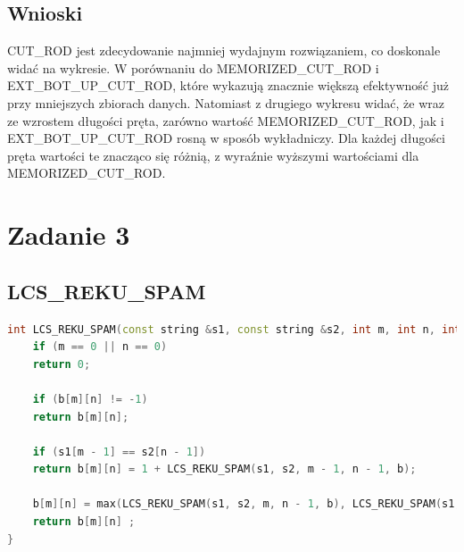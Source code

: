 \documentclass{article}
\begin{document}
	\subsection*{Wnioski} 
	CUT\_ROD jest zdecydowanie najmniej wydajnym rozwiązaniem, co doskonale widać na wykresie. W porównaniu do MEMORIZED\_CUT\_ROD i EXT\_BOT\_UP\_CUT\_ROD, które wykazują znacznie większą efektywność już przy mniejszych zbiorach danych.
	Natomiast z drugiego wykresu widać, że wraz ze wzrostem długości pręta, zarówno wartość MEMORIZED\_CUT\_ROD, jak i EXT\_BOT\_UP\_CUT\_ROD rosną w sposób wykładniczy. Dla każdej długości pręta wartości te znacząco się różnią, z wyraźnie wyższymi wartościami dla MEMORIZED\_CUT\_ROD. 
	
	
	\newpage
	\section*{Zadanie 3}
	\subsection*{LCS\_REKU\_SPAM} 
	\begin{lstlisting}[language=C++, tabsize=2, basicstyle=\footnotesize]
int LCS_REKU_SPAM(const string &s1, const string &s2, int m, int n, int **b) { 
	if (m == 0 || n == 0) 
	return 0;
	
	if (b[m][n] != -1) 
	return b[m][n];
	
	if (s1[m - 1] == s2[n - 1]) 
	return b[m][n] = 1 + LCS_REKU_SPAM(s1, s2, m - 1, n - 1, b);

	b[m][n] = max(LCS_REKU_SPAM(s1, s2, m, n - 1, b), LCS_REKU_SPAM(s1, s2, m - 1, n, b));
	return b[m][n] ;
}
		
	\end{lstlisting}
	
\end{document}
